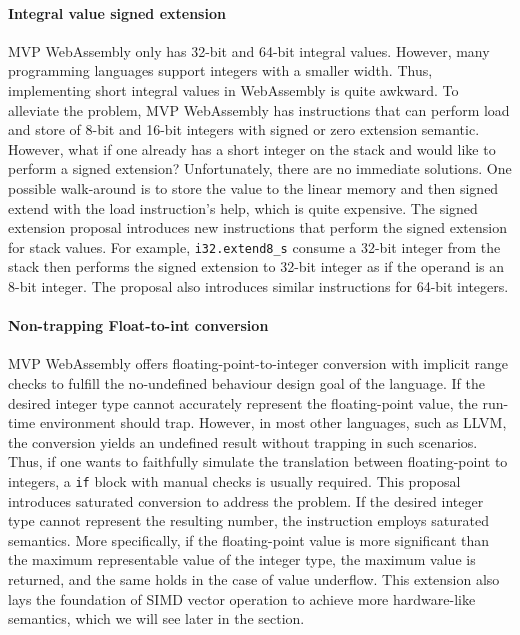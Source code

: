 \paragraph{Integral value signed extension}
MVP WebAssembly only has 32-bit and 64-bit integral values. However, many programming languages support integers with a smaller width. Thus, implementing short integral values in WebAssembly is quite awkward. To alleviate the problem, MVP WebAssembly has instructions that can perform load and store of 8-bit and 16-bit integers with signed or zero extension semantic. However, what if one already has a short integer on the stack and would like to perform a signed extension?  Unfortunately, there are no immediate solutions. One possible walk-around is to store the value to the linear memory and then signed extend with the load instruction's help, which is quite expensive. The signed extension proposal introduces new instructions that perform the signed extension for stack values. For example, \texttt{i32.extend8\_s} consume a 32-bit integer from the stack then performs the signed extension to 32-bit integer as if the operand is an 8-bit integer. The proposal also introduces similar instructions for 64-bit integers.

\paragraph{Non-trapping Float-to-int conversion}
MVP WebAssembly offers floating-point-to-integer conversion with implicit range checks to fulfill the no-undefined behaviour design goal of the language. If the desired integer type cannot accurately represent the floating-point value, the run-time environment should trap. However, in most other languages, such as LLVM, the conversion yields an undefined result without trapping in such scenarios. Thus, if one wants to faithfully simulate the translation between floating-point to integers, a \texttt{if} block with manual checks is usually required. This proposal introduces saturated conversion to address the problem. If the desired integer type cannot represent the resulting number, the instruction employs saturated semantics. More specifically, if the floating-point value is more significant than the maximum representable value of the integer type, the maximum value is returned, and the same holds in the case of value underflow. This extension also lays  the foundation of SIMD vector operation to achieve more hardware-like semantics, which we will see later in the section.


